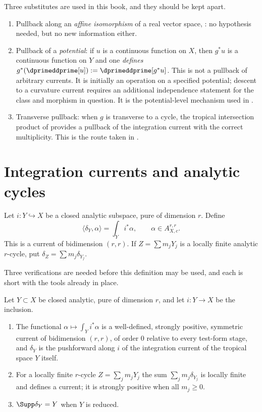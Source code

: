 \begin{remark}
\label{rem:ch14-pullback-survives}
Three substitutes are used in this book, and they should be kept apart.
\begin{enumerate}
\item Pullback along an \emph{affine isomorphism} of a real vector space,
  : no hypothesis needed, but no new
  information either.
\item Pullback of a \emph{potential}: if $u$ is a continuous function on $X$,
  then $g^*u$ is a continuous function on $Y$ and one \emph{defines}
  $g^*(\dprimeddprime[u]):=\dprimeddprime[g^*u]$.  This is not a pullback of
  arbitrary currents. It is initially an operation on a specified
  potential; descent to a curvature current requires an additional
  independence statement for the class and morphism in question. It
  is the potential-level mechanism used in .
\item Transverse pullback: when $g$ is transverse to a cycle, the tropical
  intersection product of  provides
  a pullback of the integration current with the correct multiplicity.  This
  is the route taken in .
\end{enumerate}
\end{remark}

\section{Integration currents and analytic cycles}
\label{sec:ch14-cycles}

Let $i:Y\hookrightarrow X$ be a closed analytic subspace, pure of dimension
$r$.  Define
\[
                   \langle\delta_Y,\alpha\rangle
                         =\int_Yi^*\alpha,
              \qquad \alpha\in A_{X,c}^{r,r}.
\]
This is a current of bidimension $(r,r)$.  If
$Z=\sum m_jY_j$ is a locally finite analytic $r$-cycle, put
$\delta_Z=\sum m_j\delta_{Y_j}$.

Three verifications are needed before this definition may be used, and each
is short with the tools already in place.

\begin{proposition}
\label{prop:ch14-delta-Y-current}
Let $Y\subset X$ be closed analytic, pure of dimension $r$, and let
$i:Y\to X$ be the inclusion.
\begin{enumerate}
\item The functional $\alpha\mapsto\int_Yi^*\alpha$ is a well-defined,
  strongly positive, symmetric current of bidimension $(r,r)$, of order $0$
  relative to every test-form stage, and $\delta_Y$ is the pushforward along $i$
  of the integration current of the tropical space $Y$ itself.
\item For a locally finite $r$-cycle $Z=\sum_jm_jY_j$ the sum
  $\sum_jm_j\delta_{Y_j}$ is locally finite and defines a current; it is
  strongly positive when all $m_j\ge0$.
\item $\Supp\delta_Y=Y$ when $Y$ is reduced.
\end{enumerate}
\end{proposition}

